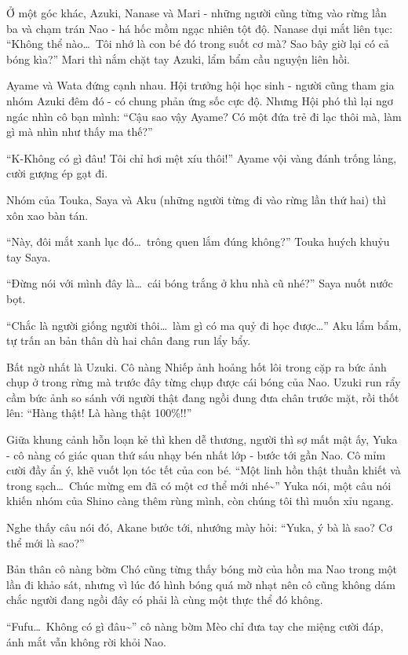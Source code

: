 \documentclass[../main.tex]{subfiles}
\begin{document}
Ở một góc khác, Azuki, Nanase và Mari - những người cũng từng vào rừng lần ba và chạm trán Nao - há hốc mồm ngạc nhiên tột độ. Nanase dụi mắt liên tục: ``Không thể nào\dots\ Tôi nhớ là con bé đó trong suốt cơ mà? Sao bây giờ lại có cả bóng kìa?'' Mari thì nắm chặt tay Azuki, lẩm bẩm cầu nguyện liên hồi.

Ayame và Wata đứng cạnh nhau. Hội trưởng hội học sinh - người cũng tham gia nhóm Azuki đêm đó - có chung phản ứng sốc cực độ. Nhưng Hội phó thì lại ngơ ngác nhìn cô bạn mình: ``Cậu sao vậy Ayame? Có một đứa trẻ đi lạc thôi mà, làm gì mà nhìn như thấy ma thế?''

``K-Không có gì đâu! Tôi chỉ hơi mệt xíu thôi!'' Ayame vội vàng đánh trống lảng, cười gượng ép gạt đi.

Nhóm của Touka, Saya và Aku (những người từng đi vào rừng lần thứ hai) thì xôn xao bàn tán.

``Này, đôi mắt xanh lục đó\dots\ trông quen lắm đúng không?'' Touka huých khuỷu tay Saya.

``Đừng nói với mình đây là\dots\ cái bóng trắng ở khu nhà cũ nhé?'' Saya nuốt nước bọt.

``Chắc là người giống người thôi\dots\ làm gì có ma quỷ đi học được\dots'' Aku lẩm bẩm, tự trấn an bản thân dù hai chân đang run lẩy bẩy.

Bất ngờ nhất là Uzuki. Cô nàng Nhiếp ảnh hoảng hốt lôi trong cặp ra bức ảnh chụp ở trong rừng mà trước đây từng chụp được cái bóng của Nao. Uzuki run rẩy cầm bức ảnh so sánh với người thật đang ngồi đung đưa chân trước mặt, rồi thốt lên: ``Hàng thật! Là hàng thật 100\%!!''

Giữa khung cảnh hỗn loạn kẻ thì khen dễ thương, người thì sợ mất mật ấy, Yuka - cô nàng có giác quan thứ sáu nhạy bén nhất lớp - bước tới gần Nao. Cô mỉm cười đầy ẩn ý, khẽ vuốt lọn tóc tết của con bé. ``Một linh hồn thật thuần khiết và trong sạch\dots\ Chúc mừng em đã có một cơ thể mới nhé\~{}'' Yuka nói, một câu nói khiến nhóm của Shino càng thêm rùng mình, còn chúng tôi thì muốn xỉu ngang.

Nghe thấy câu nói đó, Akane bước tới, nhướng mày hỏi: ``Yuka, ý bà là sao? Cơ thể mới là sao?''

Bản thân cô nàng bờm Chó cũng từng thấy bóng mờ của hồn ma Nao trong một lần đi khảo sát, nhưng vì lúc đó hình bóng quá mờ nhạt nên cô cũng không dám chắc người đang ngồi đây có phải là cùng một thực thể đó không.

``Fufu\dots\ Không có gì đâu\~{}'' cô nàng bờm Mèo chỉ đưa tay che miệng cười đáp, ánh mắt vẫn không rời khỏi Nao.
\end{document}
